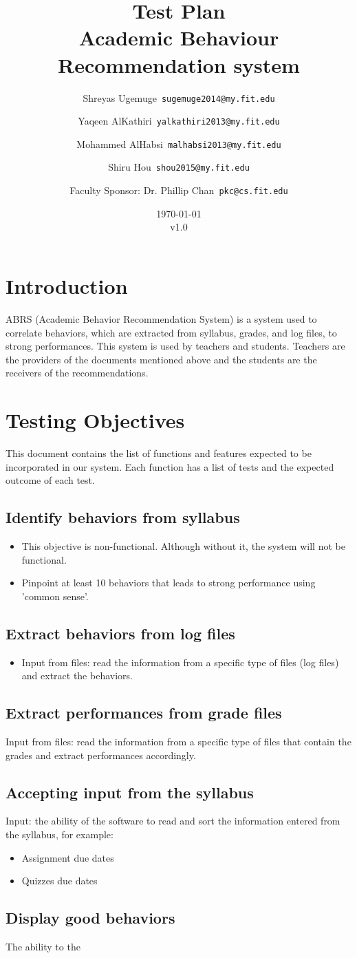 \documentclass[12pt]{article}
\title{\textbf{Test Plan} \\ \hfill \break
	Academic Behaviour Recommendation system}
\author{Shreyas Ugemuge\      \texttt{sugemuge2014@my.fit.edu}
  \and
  Yaqeen AlKathiri\      \texttt{yalkathiri2013@my.fit.edu}
  \and
	Mohammed AlHabsi\      \texttt{malhabsi2013@my.fit.edu}
  \and
  Shiru Hou\      \texttt{shou2015@my.fit.edu}
  \and
  Faculty Sponsor: Dr. Phillip Chan\      \texttt{pkc@cs.fit.edu}}
\date{\today \\ v1.0}
\begin{document}
\maketitle
\pagebreak
\tableofcontents
\pagebreak
\section{Introduction}
ABRS (Academic Behavior Recommendation System) is a system used to correlate behaviors, which are extracted from syllabus, grades, and log files, to strong performances. This system is used by teachers and students. Teachers are the providers of the documents mentioned above and the students are the receivers of the recommendations.

\section{Testing Objectives}
This document contains the list of functions and features expected to be incorporated in our system. Each function has a list of tests and the expected outcome of each test.

\subsection{Identify behaviors from syllabus}
\begin{itemize}
	\item This objective is non-functional. Although without it, the system will not be functional.
	\item Pinpoint at least 10 behaviors that leads to strong performance using 'common sense'.
\end{itemize}
\subsection{Extract behaviors from log files}
\begin{itemize}
	\item Input from files: read the information from a specific type of files (log files) and extract the behaviors.
\end{itemize}

\subsection{Extract performances from grade files}
Input from files: read the information from a specific type of files that contain the grades and extract performances accordingly.

\subsection{Accepting input from the syllabus}
Input: the ability of the software to read and sort the information entered from the syllabus, for example:  
\begin{itemize}
	\item Assignment due dates
	\item Quizzes due dates
\end{itemize}

\subsection{Display good behaviors}
The ability to the 
\end{document}
